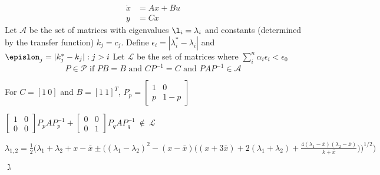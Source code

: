 \documentclass[a4paper, 11 pt]{article}
\begin{document}
\begin{equation}
  \begin{split}
    \dot{x} &= Ax + Bu \\
    y &= Cx
  \end{split}
\end{equation}
Let $\mathcal{A}$ be the set of matrices with eigenvalues $\l_{i} = \lambda_{i}$ and constants (determined by the transfer function) $k_{j} = c_{j}$. 
Define $\epsilon_{i} = |\lambda_{i}^{*} - \lambda_{i}|$ and $\epislon_{j} = |k^{*}_{j} - k_{j}| : j > i$
Let $\mathcal{L}$ be the set of matrices where $\sum_{i}^{n} \alpha_{i}\epsilon_{i} < \epsilon_{0}$
\begin{equation}
  P \in \mathcal{P} \text{ if } PB = B \text{ and } CP^{-1} = C \text{ and } PAP^{-1} \in \mathcal{A}
\end{equation}

For $C = [1 \ 0]$ and $B = [1 \ 1]^{T}$, $P_{p} = \left[\begin{matrix} 1 & 0 \\ p & 1-p \end{matrix}\right]$ 

$\left[\begin{matrix}1 & 0 \\ 0 & 0 \end{matrix}\right] P_{p}AP^{-1}_{p} + \left[\begin{matrix}0 & 0 \\ 0 & 1 \end{matrix}\right] P_{q}AP^{-1}_{q} \ \notin \ \mathcal{L}$ 


$\lambda_{1,2} = \frac{1}{2} \Bigg( \lambda_{1} + \lambda_{2} + x - \bar{x} \pm \Big( (\lambda_{1}-\lambda_{2})^{2} - (x-\bar{x}) \big( (x + 3\bar{x}) + 2(\lambda_{1} + \lambda_{2}) + \frac{4(\lambda_{1}-\bar{x})(\lambda_{2}-\bar{x})}{k + \bar{x}} \big) \Big)^{1/2} \Bigg)$

$\gimel$
\end{document}

